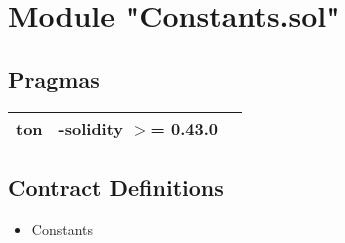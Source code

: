 
\section{Module "Constants.sol"}


\subsection{Pragmas}


\noindent\begin{tabular}{|l|l|p{5cm}|}\hline
ton & -solidity $>$= 0.43.0 &\\\hline
\end{tabular}


\subsection{Contract Definitions}

\begin{itemize}
\item Constants
\end{itemize}
